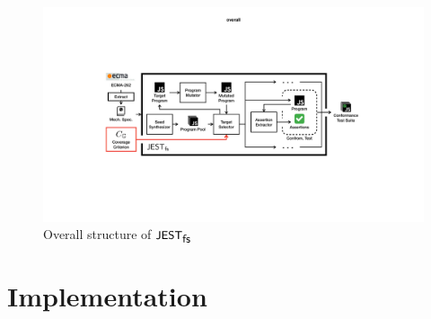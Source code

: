
%

\begin{figure}
  \includegraphics[width=.9\textwidth]{img/overall}
\vspace*{-.5em}
  \caption{Overall structure of $\textsf{\small JEST}_{\textsf{\small fs}}$}
  \label{fig:overall}
\end{figure}

\section{Implementation}\label{sec:impl}

